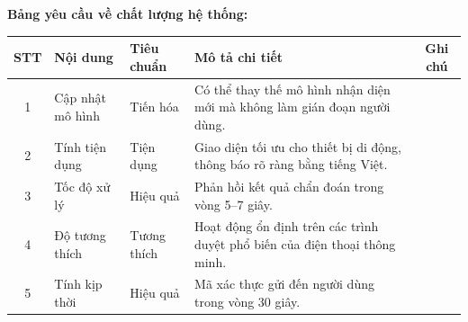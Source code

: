 \documentclass[12pt,a4paper]{article}
\begin{document}
\textbf{Bảng yêu cầu về chất lượng hệ thống:}
\begin{longtable}{|c|p{3.5cm}|p{2cm}|p{6cm}|c|}
\hline
\rowcolor{headerblue}
\textbf{STT} & \textbf{Nội dung} & \textbf{Tiêu chuẩn} & \textbf{Mô tả chi tiết} & \textbf{Ghi chú} \\
\hline
\endhead
1 & Cập nhật mô hình & Tiến hóa & Có thể thay thế mô hình nhận diện mới mà không làm gián đoạn người dùng. & \\
\hline
2 & Tính tiện dụng & Tiện dụng & Giao diện tối ưu cho thiết bị di động, thông báo rõ ràng bằng tiếng Việt. & \\
\hline
3 & Tốc độ xử lý & Hiệu quả & Phản hồi kết quả chẩn đoán trong vòng 5--7 giây. & \\
\hline
4 & Độ tương thích & Tương thích & Hoạt động ổn định trên các trình duyệt phổ biến của điện thoại thông minh. & \\
\hline
5 & Tính kịp thời & Hiệu quả & Mã xác thực gửi đến người dùng trong vòng 30 giây. & \\
\hline
\end{longtable}
\end{document}
